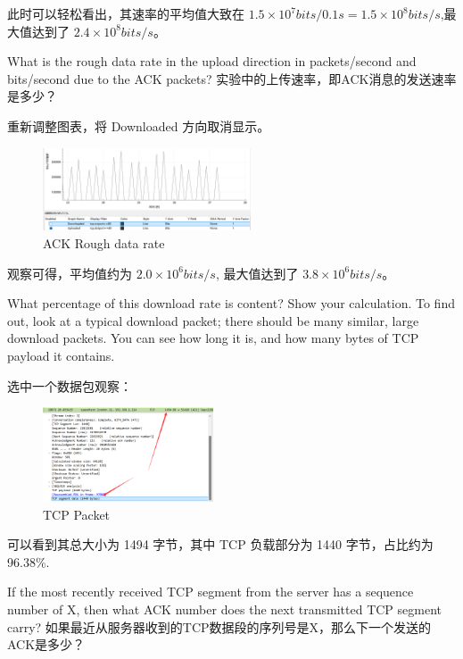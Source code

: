 \documentclass[14pt,a4paper,UTF8,twoside]{article}
\begin{document}
此时可以轻松看出，其速率的平均值大致在 $1.5 \times 10^7 bits/0.1s = 1.5 \times 10^8 bits/s$,最大值达到了 $2.4 \times 10^8 bits/s$。

\begin{rmr}
	What is the rough data rate in the upload direction in packets/second and bits/second due to the ACK packets?  
	实验中的上传速率，即ACK消息的发送速率是多少？
\end{rmr}

重新调整图表，将 Downloaded 方向取消显示。

\begin{figure}[H]
	\centering
	\includegraphics[width=0.55\textwidth]{lab6/adjust2.png}
	\caption{ACK Rough data rate}
\end{figure}

观察可得，平均值约为 $2.0 \times 10^6 bits/s$, 最大值达到了 $3.8 \times 10^6 bits/s$。

\begin{rmr}
	What percentage of this download rate is content? Show your calculation. To find out, look at a typical download packet; there should be many similar, large download packets. You can see how long it is, and how many bytes of TCP payload it contains.
\end{rmr}

选中一个数据包观察：

\begin{figure}[H]
	\centering
	\includegraphics[width=0.45\textwidth]{lab6/percent.png}
	\caption{TCP Packet}
\end{figure}

可以看到其总大小为 1494 字节，其中 TCP 负载部分为 1440 字节，占比约为 96.38\%.

\begin{rmr}
	If the most recently received TCP segment from the server has a sequence number of X, then what ACK number does the next transmitted TCP segment carry?
	如果最近从服务器收到的TCP数据段的序列号是X，那么下一个发送的ACK是多少？
\end{rmr}
\end{document}
